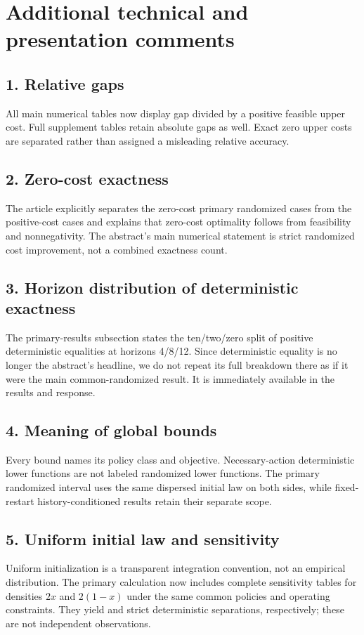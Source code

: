 \section{Additional technical and presentation comments}
\subsection{1. Relative gaps}
All main numerical tables now display gap divided by a positive feasible upper cost. Full supplement tables retain absolute gaps as well. Exact zero upper costs are separated rather than assigned a misleading relative accuracy.
\subsection{2. Zero-cost exactness}
The article explicitly separates the \PrimaryZero{} zero-cost primary randomized cases from the \PrimaryPositive{} positive-cost cases and explains that zero-cost optimality follows from feasibility and nonnegativity. The abstract's main numerical statement is strict randomized cost improvement, not a combined exactness count.
\subsection{3. Horizon distribution of deterministic exactness}
The primary-results subsection states the ten/two/zero split of positive deterministic equalities at horizons 4/8/12. Since deterministic equality is no longer the abstract's headline, we do not repeat its full breakdown there as if it were the main common-randomized result. It is immediately available in the results and response.
\subsection{4. Meaning of global bounds}
Every bound names its policy class and objective. Necessary-action deterministic lower functions are not labeled randomized lower functions. The primary randomized interval uses the same dispersed initial law on both sides, while fixed-restart history-conditioned results retain their separate scope.
\subsection{5. Uniform initial law and sensitivity}
Uniform initialization is a transparent integration convention, not an empirical distribution. The primary calculation now includes complete sensitivity tables for densities $2x$ and $2(1-x)$ under the same common policies and operating constraints. They yield \PrimaryHighStrict{} and \PrimaryLowStrict{} strict deterministic separations, respectively; these are not independent observations.
